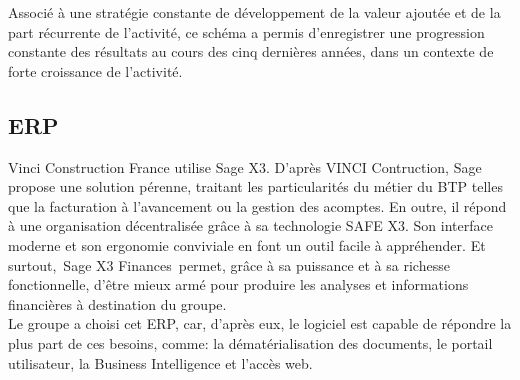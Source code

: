 \documentclass[a4paper]{article}
\begin{document}
Associé à une stratégie constante de développement de la valeur ajoutée et de la part récurrente de l’activité, ce schéma a permis d’enregistrer une progression constante des résultats au cours des cinq dernières années, dans un contexte de forte croissance de l’activité.

\subsection{ERP}

Vinci Construction France utilise Sage X3. D'après VINCI Contruction, Sage propose une solution pérenne, traitant les particularités du métier du BTP telles que la facturation à l’avancement ou la gestion des acomptes. En outre, il répond à une organisation décentralisée grâce à sa technologie SAFE X3. Son interface moderne et son ergonomie conviviale en font un outil facile à appréhender. Et surtout, Sage X3 Finances permet, grâce à sa puissance et à sa richesse fonctionnelle, d’être mieux armé pour produire les analyses et informations financières à destination du groupe. \\

Le groupe a choisi cet ERP, car, d'après eux, le logiciel est capable de répondre la plus part de ces besoins, comme: la dématérialisation des documents, le portail utilisateur, la Business Intelligence et l’accès web.
\end{document}
